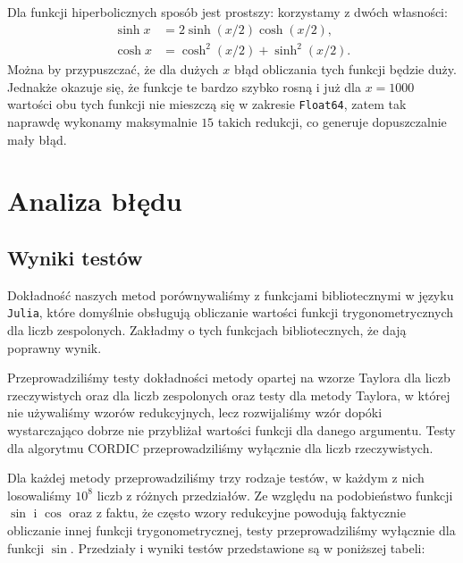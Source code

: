 \documentclass{mwart}
\theoremstyle{remark}
\theoremstyle{definition}
\theoremstyle{definition}
\begin{document}
Dla funkcji hiperbolicznych sposób jest prostszy: korzystamy z dwóch własności:
\begin{align*}
  \sinh x & = 2\sinh(x/2)\cosh(x/2),       \\
  \cosh x & = \cosh^2(x/2) + \sinh^2(x/2).
\end{align*}
Można by przypuszczać, że dla dużych $x$ błąd obliczania tych funkcji będzie duży. Jednakże okazuje się, że funkcje te bardzo szybko rosną i już dla $x = 1000$ wartości obu tych funkcji nie mieszczą się w zakresie \texttt{Float64}, zatem tak naprawdę wykonamy maksymalnie $15$ takich redukcji, co generuje dopuszczalnie mały błąd.

\section{Analiza błędu}

\subsection{Wyniki testów}
Dokładność naszych metod porównywaliśmy z funkcjami bibliotecznymi w języku \texttt{Julia}, które domyślnie obsługują obliczanie wartości funkcji trygonometrycznych dla liczb zespolonych. Zakładmy o tych funkcjach bibliotecznych, że dają poprawny wynik.

Przeprowadziliśmy testy dokładności metody opartej na wzorze Taylora dla liczb rzeczywistych oraz dla liczb zespolonych oraz testy dla metody Taylora, w której nie używaliśmy wzorów redukcyjnych, lecz rozwijaliśmy wzór dopóki wystarczająco dobrze nie przybliżał wartości funkcji dla danego argumentu. Testy dla algorytmu CORDIC przeprowadziliśmy wyłącznie dla liczb rzeczywistych. 

Dla każdej metody przeprowadziliśmy trzy rodzaje testów, w każdym z nich losowaliśmy $10^8$ liczb z różnych przedziałów. Ze względu na podobieństwo funkcji $\sin$ i $\cos$ oraz z faktu, że często wzory redukcyjne powodują faktycznie obliczanie innej funkcji trygonometrycznej, testy przeprowadziliśmy wyłącznie dla funkcji $\sin$. Przedziały i wyniki testów przedstawione są w poniższej tabeli:
\end{document}

